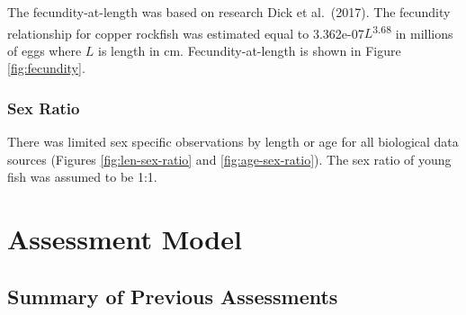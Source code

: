 \documentclass[11pt,
  english,
  a4paper,
]{article}
\begin{document}
\leavevmode\tagmcend\tagstructend\par


The fecundity-at-length was based on research Dick et al.~{(2017)\leavevmode\tagmcend\tagstructend}. The fecundity relationship for copper rockfish was estimated equal to 3.362e-07{\(L\)\leavevmode\tagmcend\tagstructend}\textsuperscript{3.68} in millions of eggs where {\(L\)\leavevmode\tagmcend\tagstructend} is length in cm. Fecundity-at-length is shown in Figure \ref{fig:fecundity}.

\leavevmode\tagmcend\tagstructend\par


\hypertarget{sex-ratio}{%
\subsubsection{Sex Ratio}\label{sex-ratio}}

\leavevmode\tagmcend\tagstructend


There was limited sex specific observations by length or age for all biological data sources (Figures \ref{fig:len-sex-ratio} and \ref{fig:age-sex-ratio}). The sex ratio of young fish was assumed to be 1:1.

\leavevmode\tagmcend\tagstructend\par


\hypertarget{assessment-model}{%
\section{Assessment Model}\label{assessment-model}}

\leavevmode\tagmcend\tagstructend


\hypertarget{summary-of-previous-assessments}{%
\subsection{Summary of Previous Assessments}\label{summary-of-previous-assessments}}
\end{document}
